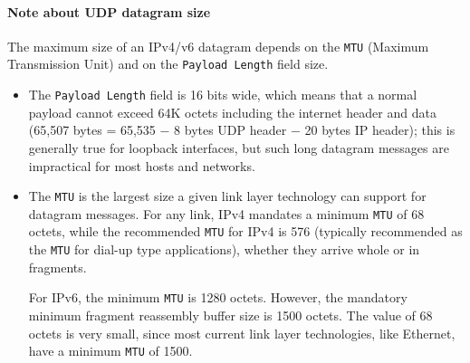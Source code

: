 \begin{Shaded}
\begin{Highlighting}[]
\OperatorTok{=} \NormalTok{(}\NormalTok{)}\OperatorTok{;}
\NormalTok{ \{ }\NormalTok{ \} }\OperatorTok{=} \NormalTok{(}\NormalTok{)}\OperatorTok{;}

\OperatorTok{=} \NormalTok{(}\NormalTok{)}\OperatorTok{;}
\OperatorTok{=}\NormalTok{(}\NormalTok{)}\OperatorTok{;}
\NormalTok{(}\OperatorTok{,} \OperatorTok{,}\KeywordTok{=\textgreater{}}\NormalTok{ \{}
\OperatorTok{,}\KeywordTok{=\textgreater{}}\NormalTok{ \{}
\NormalTok{()}\OperatorTok{;}
\NormalTok{  \})}\OperatorTok{;}
\NormalTok{\})}\OperatorTok{;}
\end{Highlighting}
\end{Shaded}

\paragraph{Note about UDP datagram
size}\label{note-about-udp-datagram-size}

The maximum size of an IPv4/v6 datagram depends on the \texttt{MTU}
(Maximum Transmission Unit) and on the \texttt{Payload\ Length} field
size.

\begin{itemize}
\item
  The \texttt{Payload\ Length} field is 16 bits wide, which means that a
  normal payload cannot exceed 64K octets including the internet header
  and data (65,507 bytes = 65,535 − 8 bytes UDP header − 20 bytes IP
  header); this is generally true for loopback interfaces, but such long
  datagram messages are impractical for most hosts and networks.
\item
  The \texttt{MTU} is the largest size a given link layer technology can
  support for datagram messages. For any link, IPv4 mandates a minimum
  \texttt{MTU} of 68 octets, while the recommended \texttt{MTU} for IPv4
  is 576 (typically recommended as the \texttt{MTU} for dial-up type
  applications), whether they arrive whole or in fragments.

  For IPv6, the minimum \texttt{MTU} is 1280 octets. However, the
  mandatory minimum fragment reassembly buffer size is 1500 octets. The
  value of 68 octets is very small, since most current link layer
  technologies, like Ethernet, have a minimum \texttt{MTU} of 1500.
\end{itemize}

